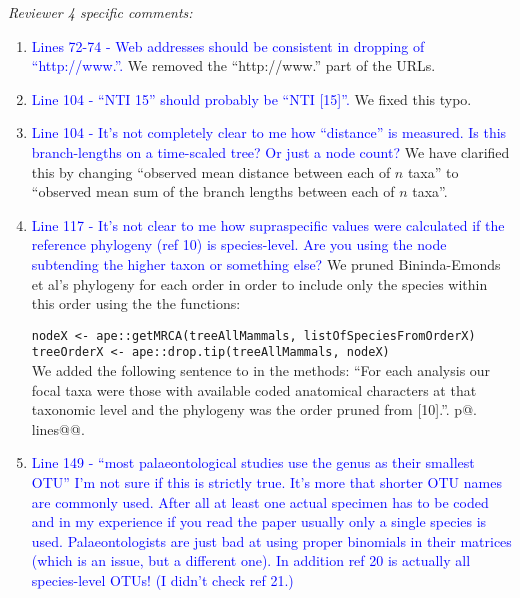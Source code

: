 \documentclass[12pt,letterpaper]{article}
\renewcommand{\subsection}[1]{%
\bigskip
\begin{center}
\begin{large}
\normalfont\itshape #1
\end{large}
\end{center}}
\begin{document}
\subsection{Reviewer 4 specific comments:}
\begin{enumerate}
\item{\textcolor{blue}{Lines 72-74 - Web addresses should be consistent in dropping of ``http://www.''.}}
We removed the ``http://www.'' part of the URLs.

\item{\textcolor{blue}{Line 104 - ``NTI 15'' should probably be ``NTI [15]''.}}
We fixed this typo.

\item{\textcolor{blue}{Line 104 - It's not completely clear to me how ``distance'' is measured. Is this branch-lengths on a time-scaled tree? Or just a node count?}}
We have clarified this by changing ``observed mean distance between each of $n$ taxa'' to ``observed mean sum of the branch lengths between each of $n$ taxa''.

\item{\textcolor{blue}{Line 117 - It's not clear to me how supraspecific values were calculated if the reference phylogeny (ref 10) is species-level. Are you using the node subtending the higher taxon or something else?}}
We pruned Bininda-Emonds et al's phylogeny for each order in order to include only the species within this order using the the functions:

\texttt{nodeX <- ape::getMRCA(treeAllMammals, listOfSpeciesFromOrderX)}\\
\texttt{treeOrderX <- ape::drop.tip(treeAllMammals, nodeX)}\\

We added the following sentence to in the methods:
``For each analysis our focal taxa were those with available coded anatomical characters at that taxonomic level and the phylogeny was the order pruned from [10].''. p@. lines@@.


\item{\textcolor{blue}{Line 149 - ``most palaeontological studies use the genus as their smallest OTU'' I'm not sure if this is strictly true. It's more that shorter OTU names are commonly used. After all at least one actual specimen has to be coded and in my experience if you read the paper usually only a single species is used. Palaeontologists are just bad at using proper binomials in their matrices (which is an issue, but a different one). In addition ref 20 is actually all species-level OTUs! (I didn't check ref 21.)}}


\end{enumerate}
\end{document}
